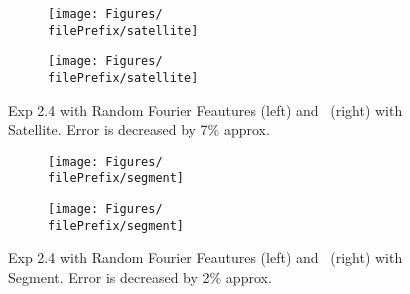 \begin{figure}[H]
  \centering
  \renewcommand{\filePrefix}{\undPrefix/rff}
  \begin{subfigure}[t]{0.5\linewidth}
    \centering\captionsetup{width=.8\linewidth}\texttt{[image: Figures/\\filePrefix/satellite]}
    \label{fig:\undPrefix_satellite}
  \end{subfigure}%
  \renewcommand{\filePrefix}{\undPrefix/nys}%
  \begin{subfigure}[t]{0.5\linewidth}
    \centering\captionsetup{width=.8\linewidth}\texttt{[image: Figures/\\filePrefix/satellite]}
    \label{fig:\undPrefix_satellite}
  \end{subfigure}
  \caption*{Exp 2.4 with Random Fourier Feautures (left) and \Nys\ (right) with Satellite. Error is decreased by 7\% approx.}
\end{figure}

\begin{figure}[H]
  \centering
  \renewcommand{\filePrefix}{\undPrefix/rff}
  \begin{subfigure}[t]{0.5\linewidth}
    \centering\captionsetup{width=.8\linewidth}\texttt{[image: Figures/\\filePrefix/segment]}
    \label{fig:\undPrefix_segment}
  \end{subfigure}%
  \renewcommand{\filePrefix}{\undPrefix/nys}%
  \begin{subfigure}[t]{0.5\linewidth}
    \centering\captionsetup{width=.8\linewidth}\texttt{[image: Figures/\\filePrefix/segment]}
    \label{fig:\undPrefix_segment}
  \end{subfigure}%
  \caption*{Exp 2.4 with Random Fourier Feautures (left) and \Nys\ (right)
   with Segment. Error is decreased by 2\% approx.}
\end{figure}


